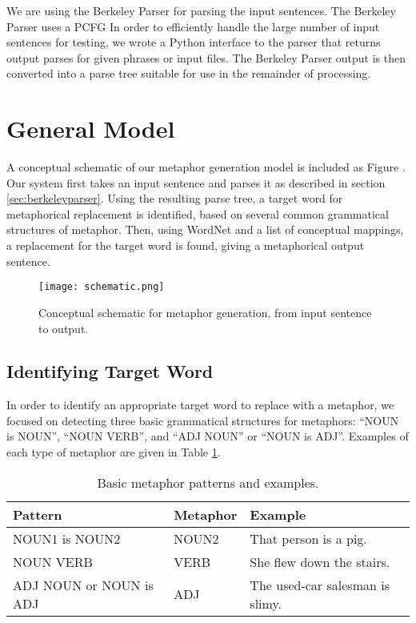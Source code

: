 \documentclass[12pt]{article}
\begin{document}
We are using the Berkeley Parser \cite{berkeleyparser} for parsing the input sentences.  The Berkeley Parser uses a PCFG
In order to efficiently handle the large number of input sentences for testing, we wrote a Python interface to the parser that returns output parses for given phrases or input files.  The Berkeley Parser output is then converted into a parse tree suitable for use in the remainder of processing.

\section{General Model}

A conceptual schematic of our metaphor generation model is included as Figure .  Our system first takes an input sentence and parses it as described in section \ref{sec:berkeleyparser}.  Using the resulting parse tree, a target word for metaphorical replacement is identified, based on several common grammatical structures of metaphor.  Then, using WordNet and a list of conceptual mappings, a replacement for the target word is found, giving a metaphorical output sentence.

\begin{figure}[h]
	\centering
	\texttt{[image: schematic.png]}
	\caption{Conceptual schematic for metaphor generation, from input sentence to output.}
	\label{fig:schematic}
\end{figure}

\subsection{Identifying Target Word}

In order to identify an appropriate target word to replace with a metaphor, we focused on detecting three basic grammatical structures for metaphors: ``NOUN is NOUN'', ``NOUN VERB'', and ``ADJ NOUN'' or ``NOUN is ADJ''.  Examples of each type of metaphor are given in Table \ref{tab:metaphorexamples}.

\begin{table}[h]
	\centering
	\small
	\begin{tabular}{|l|l|l|} \hline
		Pattern & Metaphor & Example\\	\hline
		NOUN1 is NOUN2 & NOUN2 & That person is a pig.\\ \hline
		NOUN VERB & VERB & She flew down the stairs.\\ \hline
		ADJ NOUN or NOUN is ADJ & ADJ & The used-car salesman is slimy.\\ \hline
	\end{tabular}
	\caption{Basic metaphor patterns and examples.}
	\label{tab:metaphorexamples}
\end{table}
\end{document}
